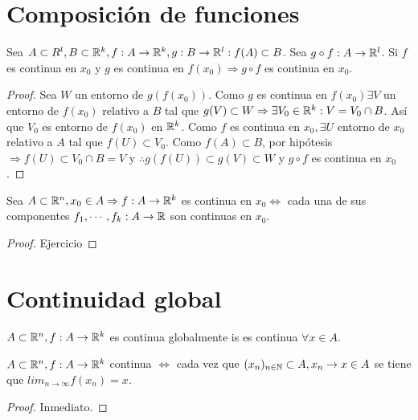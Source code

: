 \section{Composición de funciones}

\begin{theorem}
  Sea $A \subset R^l, B \subset \mathbb{R}^k, f: A \to \mathbb{R}^k, g: B \to \mathbb{R}^l : f(A) \subset B$. Sea $g \circ f: A \to \mathbb{R}^l$. Si $f$ es continua en $x_0$ y $g$ es continua en $f(x_0) \Rightarrow g \circ f$ es continua en $x_0$.
  \begin{proof}
    Sea $W$ un entorno de $g(f(x_0))$. Como $g$ es continua en $f(x_0) \exists V$ un entorno de $f(x_0)$ relativo a $B$ tal que $g(V) \subset W \Rightarrow \exists V_0 \in \mathbb{R}^k : V = V_0 \cap B$. Así que $V_0$ es entorno de $f(x_0)$ en $\mathbb{R}^k$. Como $f$ es continua en $x_0, \exists U$ entorno de $x_0$ relativo a $A$ tal que $f(U) \subset V_0$. Como $f(A) \subset B$, por hipótesis $\Rightarrow f(U) \subset V_0 \cap B = V$ y $\therefore g(f(U)) \subset g(V) \subset W$ y $g \circ f$ es continua en $x_0$. 
  \end{proof}
\end{theorem}

\begin{prop}
  Sea $A \subset \mathbb{R}^n, x_0 \in A \Rightarrow f: A \to \mathbb{R}^k$ es continua en $x_0 \iff$ cada una de sus componentes $f_1, \cdots, f_k: A \to \mathbb{R}$ son continuas en $x_0$.
  \begin{proof}
    Ejercicio
  \end{proof}
\end{prop}

\section{Continuidad global}

\begin{definition}
  $A \subset \mathbb{R}^n, f: A \to \mathbb{R}^k$ es continua globalmente is es continua $\forall x \in A$.
\end{definition}

\begin{prop}
  $A \subset \mathbb{R}^n, f: A \to \mathbb{R}^k$ continua $\iff$ cada vez que $(x_n)_{n \in \mathbb{N}} \subset A, x_n \to x \in A$ se tiene que $lim_{n \to \infty} f(x_n) = x$.
  \begin{proof}
    Inmediato.
  \end{proof}
\end{prop}

